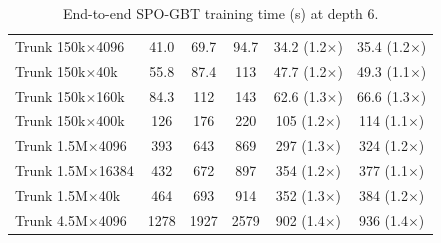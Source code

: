 \begin{table}[p]
\begin{tabular}{l|ccc|cc}
        Trunk 150k$\times$4096 & 41.0 & 69.7 & 94.7 & 34.2 (1.2$\times$) & 35.4 (1.2$\times$) \\
        Trunk 150k$\times$40k & 55.8 & 87.4 & 113 & 47.7 (1.2$\times$) & 49.3 (1.1$\times$) \\
        Trunk 150k$\times$160k & 84.3 & 112 & 143 & 62.6 (1.3$\times$) & 66.6 (1.3$\times$) \\
        Trunk 150k$\times$400k & 126 & 176 & 220 & 105 (1.2$\times$) & 114 (1.1$\times$) \\
        Trunk 1.5M$\times$4096 & 393 & 643 & 869 & 297 (1.3$\times$) & 324 (1.2$\times$) \\
        Trunk 1.5M$\times$16384 & 432 & 672 & 897 & 354 (1.2$\times$) & 377 (1.1$\times$) \\
        Trunk 1.5M$\times$40k & 464 & 693 & 914 & 352 (1.3$\times$) & 384 (1.2$\times$) \\
        Trunk 4.5M$\times$4096 & 1278 & 1927 & 2579 & 902 (1.4$\times$) & 936 (1.4$\times$) \\
        \hline
    \end{tabular}
    \caption{End-to-end SPO-GBT training time (s) at depth 6.}
    \label{tab:train-time-gbt-depth6}
\end{table}
